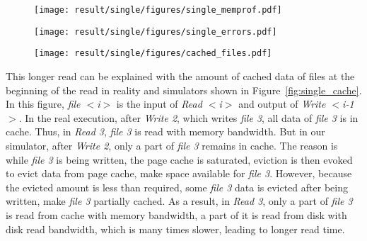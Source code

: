 \documentclass[conference]{IEEEtran}
\newcommand{\tristan}[1]{\color{orange}\textbf{From Tristan:}#1\color{black}}
\begin{document}
			\begin{figure*}
			\centering
			\begin{subfigure}{\linewidth}
				\centering
   				\texttt{[image: result/single/figures/single\_memprof.pdf]}
			\end{subfigure}
			\caption{Memory profiling results with different input file sizes \tristan{put the simulation/real conditions on the side, make them larger and use the same color code as below (pink for real, etc). Put the memory values on top, similar to how they are in the graphs below. }}
			\label{fig:single_memprof}	
			\begin{subfigure}{\linewidth}
				\centering
   				\texttt{[image: result/single/figures/single\_errors.pdf]}
			\end{subfigure}
			\caption{Simulation errors with different input file sizes}
			\label{fig:single_error}	
			\begin{subfigure}{\linewidth}
				\centering
   				\texttt{[image: result/single/figures/cached\_files.pdf]}
			\end{subfigure}	
			\label{fig:single_cache}
   			\caption{Amount of file data in cache after each I/O activity with 100GB of input \tristan{Make a grouped histogram (1 histogram with two bars, one for real, one for simulation). Add a grouped histogram for 20GB. Use the same color code everywhere: real should be pink.}}
			\end{figure*}			

			This longer read can be explained with the amount of cached data of files 
			at the beginning of the read in reality and simulators shown in 
			Figure~\ref{fig:single_cache}. 			
			In this figure, \textit{file $<$i$>$} is the input of \textit{Read $<$i$>$} and 
			output of \textit{Write $<$i-1$>$}. 
			In the real execution, after \textit{Write 2}, which writes \textit{file 3}, 
			all data of \textit{file 3} is in cache. 
			Thus, in \textit{Read 3}, \textit{file 3} is read with memory bandwidth. 
			But in our simulator, after \textit{Write 2}, only a part of \textit{file 3} 
			remains in cache. 
			The reason is while \textit{file 3}  is being written, the page cache is saturated, 
			eviction is then evoked to evict data from page cache, make space 
			available for \textit{file 3}. 
			However, because the evicted amount is less than required, 
			some \textit{file 3} data is evicted after being written, make \textit{file 3} 
			partially cached. 
			As a result, in \textit{Read 3}, only a part of \textit{file 3} is read from cache 
			with memory bandwidth, a part of it is read from disk with disk read bandwidth, 
			which is many times slower, leading to longer read time. 			
			
\end{document}
